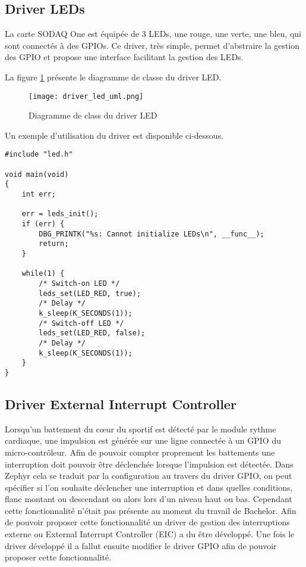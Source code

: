 \subsection{Driver LEDs}

La carte SODAQ One est équipée de 3 LEDs, une rouge, une verte, une bleu, qui sont connectés à des GPIOs. Ce driver, très simple, permet d'abstraire la gestion des GPIO et propose une interface facilitant la gestion des LEDs.

La figure \ref{fig:driver_led_uml} présente le diagramme de classe du driver LED.

\begin{figure}[htb]
\centering 
\texttt{[image: driver\_led\_uml.png]} 
\caption{Diagramme de class du driver LED}
\label{fig:driver_led_uml}
\end{figure}

Un exemple d'utilisation du driver est disponible ci-dessous.

\begin{lstlisting}[style=CStyle]
#include "led.h"

void main(void)
{
	int err;

	err = leds_init();
	if (err) {
		DBG_PRINTK("%s: Cannot initialize LEDs\n", __func__);
		return;
	}
	
	while(1) {
		/* Switch-on LED */
		leds_set(LED_RED, true);
		/* Delay */
		k_sleep(K_SECONDS(1));
		/* Switch-off LED */
		leds_set(LED_RED, false);
		/* Delay */
		k_sleep(K_SECONDS(1));		
	}
}
\end{lstlisting}

\subsection{Driver External Interrupt Controller}

Lorsqu'un battement du cœur du sportif est détecté par le module rythme cardiaque, une impulsion est générée sur une ligne connectée à un GPIO du micro-contrôleur. Afin de pouvoir compter proprement les battements une interruption doit pouvoir être déclenchée lorsque l'impulsion est détectée. Dans Zephyr cela se traduit par la configuration au travers du driver GPIO, on peut spécifier si l'on souhaite déclencher une interruption et dans quelles conditions, flanc montant ou descendant ou alors lors d'un niveau haut ou bas. Cependant cette fonctionnalité n'était pas présente au moment du travail de Bachelor. Afin de pouvoir proposer cette fonctionnalité un driver de gestion des interruptions externe ou External Interrupt Controller (EIC) a du être développé. Une fois le driver développé il a fallut ensuite modifier le driver GPIO afin de pouvoir proposer cette fonctionnalité.

